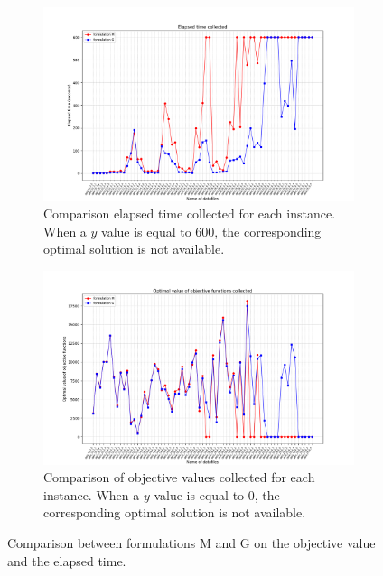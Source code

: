 \documentclass[preprint,12pt,authoryear]{elsarticle}
\begin{document}
\begin{figure}[h!]
  \begin{center}
   \begin{subfigure}{1\textwidth}
      \includegraphics[scale=0.45]{images/resultsMGtime.png}
      \caption{Comparison elapsed time  collected for each instance. When a $y$ value is equal to 600, the corresponding optimal solution is not available.}
      \label{fig:resTimeMG}
    \end{subfigure}
    \begin{subfigure}{1\textwidth}
      \includegraphics[scale=0.45]{images/resultsMGobjFct.png}
      \caption{Comparison of objective values collected for each instance. When a $y$ value is equal to 0, the corresponding optimal solution is not available.}
      \label{fig:resObjFctMG}
    \end{subfigure}
  \end{center}
  \caption{Comparison between formulations M and G on the objective value and the elapsed time.}
   \label{fig:res1MG}
\end{figure}
\end{document}

